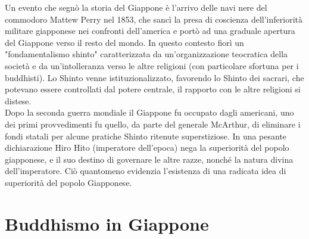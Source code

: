 \documentclass[10pt,a4paper]{report}
\begin{document}
Un evento che segnò la storia del Giappone è l'arrivo delle navi nere del commodoro Mattew Perry nel 1853, che sancì la presa di coscienza dell'inferiorità militare giapponese nei confronti dell'america e portò ad una graduale apertura del Giappone verso il resto del mondo. In questo contesto fiorì un "fondamentalismo shinto" caratterizzata da un'organizzazione teocratica della società e da un'intolleranza verso le altre religioni (con particolare sfortuna per i buddhisti). Lo Shinto venne istituzionalizzato, favorendo lo Shinto dei sacrari, che potevano essere controllati dal potere centrale, il rapporto con le altre religioni si distese.\\
Dopo la seconda guerra mondiale il Giappone fu occupato dagli americani, uno dei primi provvedimenti fu quello, da parte del generale McArthur, di eliminare i fondi statali per alcune pratiche Shinto ritenute superstiziose. In una pesante dichiarazione Hiro Hito (imperatore dell'epoca) nega la superiorità del popolo giapponese, e il suo destino di governare le altre razze, nonché la natura divina dell'imperatore. Ciò quantomeno evidenzia l'esistenza di una radicata idea di superiorità del popolo Giapponese. 
\chapter{Buddhismo in Giappone}
\end{document}

